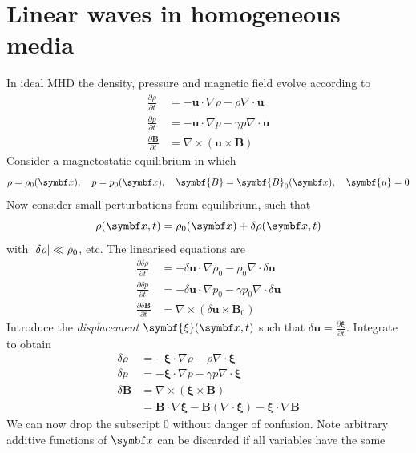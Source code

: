 \documentclass{jknotes}
\newcommand{\B}{\symbf{B}}
\renewcommand{\u}{\symbf{u}}
\newcommand{\disp}{\symbf{\xi}}
\begin{document}
\section{Linear waves in homogeneous media}
In ideal MHD the density, pressure and magnetic field evolve according to
\begin{align}
	\frac{\partial \rho}{\partial t} &= - \u \cdot \nabla \rho -\rho \nabla
	\cdot \u \\
	\frac{\partial  p}{\partial t} &= -\u \cdot \nabla p - \gamma  p \nabla
	\cdot \u \\
	\frac{\partial \B}{\partial t} &= \nabla \times (\u \times \B)
\end{align}
Consider a magnetostatic equilibrium in which 
\begin{equation}
	\rho = \rho_0(\x), \hspace{1em} p = p_0(\x), \hspace{1em} \B = \B_0(\x),
	\hspace{1em} \u  = 0
\end{equation}
Now consider small perturbations from equilibrium, such that
\begin{equation}
	\rho(\x, t ) = \rho_0(\x) + \delta \rho(\x, t)
\end{equation}
with $\abs{\delta \rho} \ll\rho_0$, etc. The linearised equations are
\begin{align}
	\frac{\partial \delta\rho}{\partial t} &= - \delta\u \cdot \nabla \rho_0
	-\rho_0 \nabla \cdot \delta\u \\
	\frac{\partial  \delta p}{\partial t} &= -\delta\u \cdot \nabla p_0 -
	\gamma  p_0 \nabla \cdot \delta\u \\
	\frac{\partial \delta\B}{\partial t} &= \nabla \times (\delta\u \times
	\B_0)
\end{align}
Introduce the \emph{displacement} $\disp(\x,t)$ such that $\delta \u =
\frac{\partial \disp}{\partial t}$. Integrate to obtain
\begin{align}
	\delta \rho &= -\disp \cdot \nabla \rho - \rho \nabla \cdot \disp \\
	\delta p &= -\disp \cdot \nabla p - \gamma p \nabla \cdot \disp \\
	\delta \B &= \nabla \times (\disp \times \B) \\
			  &= \B \cdot \nabla \disp - \B (\nabla \cdot \disp) - \disp \cdot
			  \nabla \B
\end{align}
We can now drop the subscript $0$ without danger of confusion. Note arbitrary
additive functions of $\x$ can be discarded if all variables have the same
\end{document}

